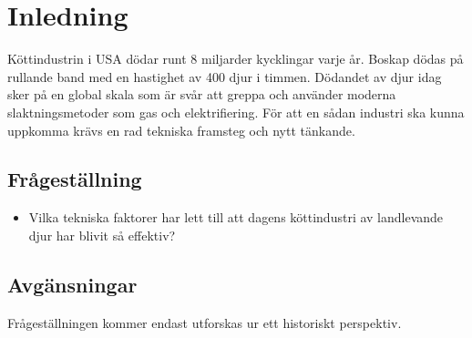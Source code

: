 \section{Inledning}
Köttindustrin i USA dödar runt 8 miljarder kycklingar varje år. Boskap dödas på rullande band med en hastighet av 400 djur i timmen. Dödandet av djur idag sker på en global skala som är svår att greppa och använder moderna slaktningsmetoder som gas och elektrifiering. \citep{edgerton}
\newline
\newline
För att en sådan industri ska kunna uppkomma krävs en rad tekniska framsteg och nytt tänkande.   

\subsection{Frågeställning}
\begin{itemize}
	\item Vilka tekniska faktorer har lett till att dagens köttindustri av landlevande djur har blivit så effektiv?
\end{itemize}

\subsection{Avgänsningar}
Frågeställningen kommer endast utforskas ur ett historiskt perspektiv.